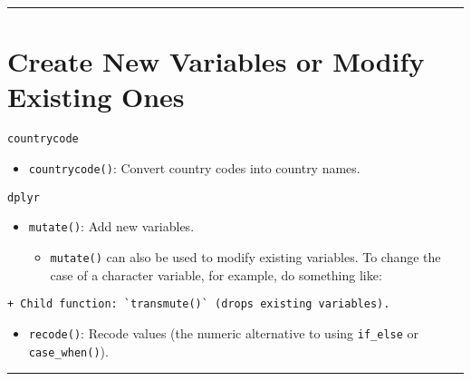\documentclass[
]{book}
\newenvironment{Shaded}{\begin{snugshade}}{\end{snugshade}}
\newcommand{\DataTypeTok}[1]{\textcolor[rgb]{0.13,0.29,0.53}{#1}}
\newcommand{\KeywordTok}[1]{\textcolor[rgb]{0.13,0.29,0.53}{\textbf{#1}}}
\newcommand{\NormalTok}[1]{#1}
\newcommand{\OperatorTok}[1]{\textcolor[rgb]{0.81,0.36,0.00}{\textbf{#1}}}
\newcommand{\StringTok}[1]{\textcolor[rgb]{0.31,0.60,0.02}{#1}}
\providecommand{\tightlist}{%
  \setlength{\itemsep}{0pt}\setlength{\parskip}{0pt}}
\begin{document}
\begin{center}\rule{0.5\linewidth}{0.5pt}\end{center}

\hypertarget{create-new-variables-or-modify-existing-ones}{%
\section{Create New Variables or Modify Existing Ones}\label{create-new-variables-or-modify-existing-ones}}

\texttt{countrycode}

\begin{itemize}
\tightlist
\item
  \texttt{countrycode()}: Convert country codes into country names.
\end{itemize}

\texttt{dplyr}

\begin{itemize}
\tightlist
\item
  \texttt{mutate()}: Add new variables.

  \begin{itemize}
  \tightlist
  \item
    \texttt{mutate()} can also be used to modify existing variables. To change the case of a character variable, for example, do something like:
  \end{itemize}
\end{itemize}

\begin{Shaded}
\end{Shaded}

\begin{verbatim}
+ Child function: `transmute()` (drops existing variables).
\end{verbatim}

\begin{itemize}
\tightlist
\item
  \texttt{recode()}: Recode values (the numeric alternative to using \texttt{if\_else} or \texttt{case\_when()}).
\end{itemize}

\begin{center}\rule{0.5\linewidth}{0.5pt}\end{center}
\end{document}
